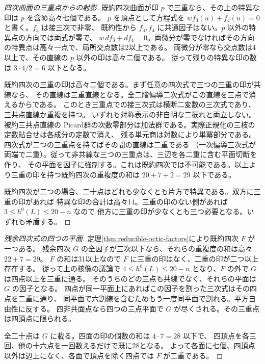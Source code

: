 \begin{proof}[四次曲面の三重点からの射影]
既約四次曲面が印 $p$ で三重なら、その上の特異な印は $p$ を含め高々七個である。
$p$ を頂点として方程式を $w f_3(u)+f_4(u)=0$ と書く。$f_3$ は接三次で非零、
既約性から $f_3,f_4$ に共通因子はない。$p$ 以外の特異点の方向では両式が零で、
$w\,df_3+df_4=0$。両微分が零でなければその方向の特異点は高々一点で、局所交点数は2以上である。
両微分が零なら交点数は4以上で、その直線の $p$ 以外の印は高々二個である。
従って残りの特異な印の数は $3\cdot4/2=6$ 以下となる。

既約四次の三重の印は高々二個である。まず任意の四次式で三つの三重の印が共線なら、
その直線は三重直線となる。全二階偏導二次式がこの直線を三点で消えるからである。
このとき三重点での接三次式は横断二変数の三次式であり、三共点直線か重複を持つ。
いずれも対称表示の非自明な二捩れと両立しない。被約三共点直線の
Picard群の次数零部分は加法群である。実際正規化の三枝の定数貼合せは各成分の定数で消え、
残る単元商は対数により単冪部分である。四次式が二つの三重点を持てばその間の直線は二重である
（一次偏導三次式が両端で二重）。従って非共線な三つの三重点は、三辺を各二重に含む平面切断を作り、
その平面を因子に強制する。これは既約四次では不可能である。以上より三重の印を持つ既約四次の重複度の和は
$20+7+2=29$ 以下である。

既約四次が二つの場合、二十点はどれも少なくとも片方で特異である。双方に三重の印があれば
特異な印の合計は高々14。三重の印のない側があれば $3\le h^0(L)\le20-n$ なので
他方に三重の印が少なくとも三つ必要となる。いずれも矛盾する。
\end{proof}
\begin{proof}[残余四次式の四つの平面]
定理\ref{thm:reducible-octic-factors}により既約四次 $F$ が一つある。
残余四次 $G$ の全因子が三次以下なら、それらの重複度の和は高々 $22+7=29$。
$F$ の和は31以上なので $F$ に三重の印はなく、二重の印が二つ以上存在する。
従って上の核像の議論で $4\le h^0(L)\le20-n$ となり、$F$ の外で $G$ は四点以上を三重に通る。
そのうちのどの三点も共線でなく、それらの平面は $G$ の因子となる。
四点が同一平面上にあればこの因子を割った三次式はその四点を二重に通り、
同平面で六割線を含むためもう一度同平面で割れる。平方自由性に反する。
四非共面点なら四つの三点平面で $G$ が尽くされる。その三重点は四頂点に限られる。

全二十点は $G$ に載る。四面の印の個数の和は $4\cdot7=28$ 以下で、
四頂点を各三回、他の十六点を一回数えるだけで既に28となる。
よって各面に七個、四頂点以外は辺上になく、各面で頂点を除く四点では $F$ が二重である。
\end{proof}
